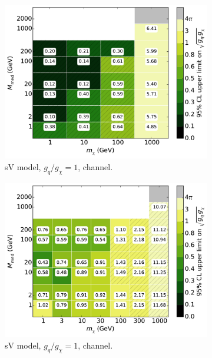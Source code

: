 \begin{figure}
  \centering
  \begin{subfigure}[t]{0.32\textwidth}
    \centering
    \includegraphics[width=1.\textwidth]{figures/grid_basepoints_SVD_rat1_monojet.pdf}
    \caption{sV model, $g_q/g_{\chi} = 1$, \monojet channel.}
  \end{subfigure}
  \begin{subfigure}[t]{0.32\textwidth}
    \centering
    \includegraphics[width=1.\textwidth]{figures/grid_allpoints_SVD_rat1.pdf}
    \caption{sV model, $g_q/g_{\chi} = 1$, \monoZ channel.}
  \end{subfigure}
  \begin{subfigure}[t]{0.32\textwidth}

\end{subfigure}
\end{figure}
